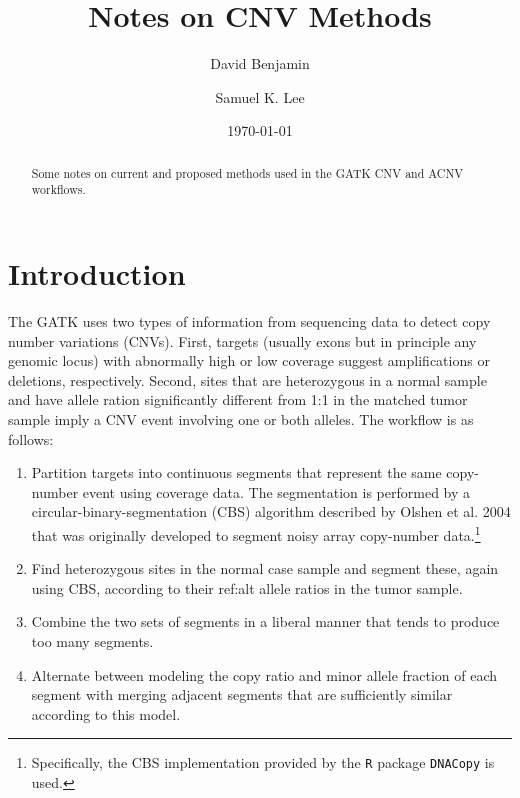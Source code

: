 \documentclass[nofootinbib,amssymb,amsmath]{revtex4}
\begin{document}
\title{Notes on CNV Methods}
\author{David Benjamin}

\author{Samuel K. Lee}

\date{\today}

\begin{abstract}
Some notes on current and proposed methods used in the GATK CNV and ACNV workflows.
\end{abstract}

\maketitle

\section{Introduction}\label{introduction}

The GATK uses two types of information from sequencing data to detect copy number variations (CNVs).  First, targets (usually exons but in principle any genomic locus) with abnormally high or low coverage suggest amplifications or deletions, respectively.  Second, sites that are heterozygous in a normal sample and have allele ration significantly different from 1:1 in the matched tumor sample imply a CNV event involving one or both alleles.  The workflow is as follows:

\begin{enumerate}

\item Partition targets into continuous segments that represent the same copy-number event using coverage data.  The segmentation is performed by a circular-binary-segmentation (CBS) algorithm described by Olshen et al. 2004 that was originally developed to segment noisy array copy-number data.\footnote{Specifically, the CBS implementation provided by the \texttt{R} package \texttt{DNACopy} is used.}

\item Find heterozygous sites in the normal case sample and segment these, again using CBS, according to their ref:alt allele ratios in the tumor sample.

\item Combine the two sets of segments in a liberal manner that tends to produce too many segments.

\item Alternate between modeling the copy ratio and minor allele fraction of each segment with merging adjacent segments that are sufficiently similar according to this model.

\end{enumerate}
\end{document}
